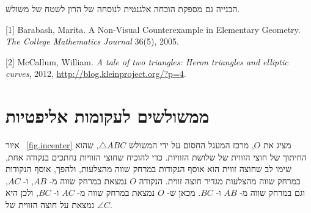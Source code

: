\documentclass[12pt,a4paper]{article}
\begin{document}
הבנייה גם מספקת הוכחה אלגנטית לנוסחה של הרון לשטח של משולש.



[1] Barabash, Marita. A Non-Visual Counterexample in Elementary Geometry. \textit{The College Mathematics Journal} 36(5), 2005.

[2] McCallum, William. \textit{A tale of two triangles: Heron triangles and elliptic curves}, 2012, \url{http://blog.kleinproject.org/?p=4}.



\section{%
ממשולשים לעקומות אליפטיות%
}

איור%
~\ref{fig.incenter}
מציג את 
$O$, 
מרכז המעגל החסום על ידי המשולש
$\triangle ABC$, 
שהוא החיתוך של חוצי הזווית של שלושת הזוויות. כדי להוכיח שחוצי הזוויות נחתכים בנקודה אחת, שימו לב שחוצה זווית הוא אוסף הנקודות במרחק שווה מהצלעות, ולהפך, אוסף הנקודות במרחק שווה מהצלעות מגדיר חוצה זווית. הנקודה
$O$
נמצאת במרחק שווה מ-%
$AB$,
ו-%
$AC$,
וגם במרחק שווה מ-%
$AB$
ו-%
$BC$.
מכאן ש-%
$O$
נמצאת במרחק שווה מ-%
$AC$
ו-%
$BC$,
ולכן היא נמצאת על חוצה הזווית של 
$\angle C$.

\vspace*{-6ex}
\end{document}
